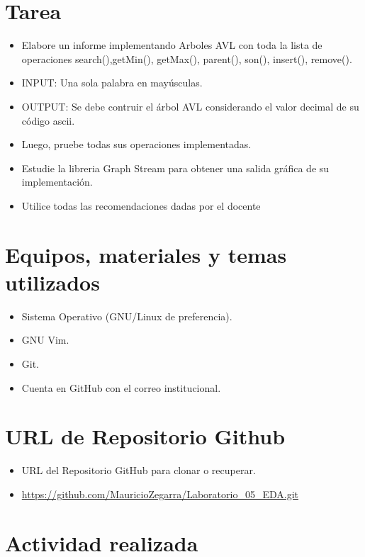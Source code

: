 \documentclass{article}
\begin{document}
	\section{Tarea}
	\begin{itemize}		
		\item Elabore un informe implementando Arboles AVL con toda la lista de operaciones search(),getMin(), getMax(), parent(), son(), insert(), remove(). 
		\item INPUT: Una sola palabra en mayúsculas.
		\item OUTPUT: Se debe contruir el árbol AVL considerando el valor decimal de su código ascii.
		\item Luego, pruebe todas sus operaciones implementadas.
		\item Estudie la libreria Graph Stream para obtener una salida gráfica de su implementación.
		\item
Utilice todas las recomendaciones dadas por el docente
	\end{itemize}
		
	\section{Equipos, materiales y temas utilizados}
	\begin{itemize}
		\item Sistema Operativo (GNU/Linux de preferencia).
		\item GNU Vim.
		\item Git.
		\item Cuenta en GitHub con el correo institucional.
	\end{itemize}
	
	\section{URL de Repositorio Github}
	\begin{itemize}
		\item URL del Repositorio GitHub para clonar o recuperar.
		\item \url{https://github.com/MauricioZegarra/Laboratorio_05_EDA.git}
	\end{itemize}
	
	\section{Actividad realizada}
	
\end{document}
